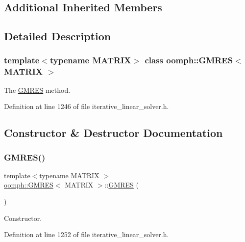 \subsection*{Additional Inherited Members}


\subsection{Detailed Description}
\subsubsection*{template$<$typename M\+A\+T\+R\+IX$>$\newline
class oomph\+::\+G\+M\+R\+E\+S$<$ M\+A\+T\+R\+I\+X $>$}

The \hyperlink{classoomph_1_1GMRES}{G\+M\+R\+ES} method. 

Definition at line 1246 of file iterative\+\_\+linear\+\_\+solver.\+h.



\subsection{Constructor \& Destructor Documentation}
\mbox{\label{classoomph_1_1GMRES_a6f19644223af4b8f2fb9f327239b6497}} 
\subsubsection{\texorpdfstring{G\+M\+R\+E\+S()}{GMRES()}\hspace{0.1cm}{\footnotesize\ttfamily [1/2]}}
{\footnotesize\ttfamily template$<$typename M\+A\+T\+R\+IX $>$ \\
\hyperlink{classoomph_1_1GMRES}{oomph\+::\+G\+M\+R\+ES}$<$ M\+A\+T\+R\+IX $>$\+::\hyperlink{classoomph_1_1GMRES}{G\+M\+R\+ES} (\begin{DoxyParamCaption}{ }\end{DoxyParamCaption})\hspace{0.3cm}{\ttfamily [inline]}}



Constructor. 



Definition at line 1252 of file iterative\+\_\+linear\+\_\+solver.\+h.

\mbox{\label{classoomph_1_1GMRES_a9760251d952af2d5f2c47c90235d45d5}} 
